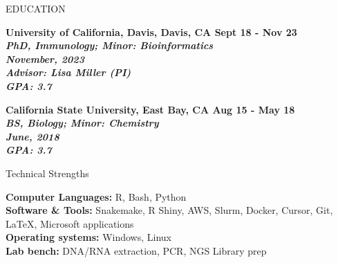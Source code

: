 \documentclass{resume} %
\begin{document}

\begin{rSection}{EDUCATION}

\bf University of California, Davis, Davis, CA
\hfill Sept 18 - Nov 23\\
\sl PhD, Immunology; Minor: Bioinformatics \\
\textit{November, 2023} \\
\textit{Advisor:} Lisa Miller (PI) \\
\hfill GPA: 3.7

\bf California State University, East Bay, CA 
\hfill Aug 15 - May 18\\
\sl BS, Biology; Minor: Chemistry \\
\textit{June, 2018} \\
\hfill GPA: 3.7

\end{rSection}


\begin{rSection}{Technical Strengths}

\textbf{Computer Languages:} R, Bash, Python \\
\textbf{Software \& Tools:} Snakemake, R Shiny, AWS, Slurm, Docker, Cursor, Git, LaTeX, Microsoft applications \\
\textbf{Operating systems:} Windows, Linux \\
\textbf{Lab bench:} DNA/RNA extraction, PCR, NGS Library prep \\

\end{rSection}

\end{document}
